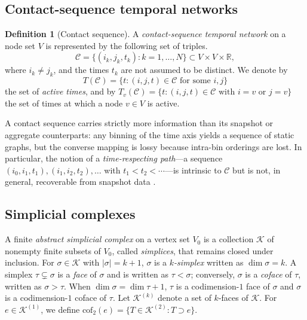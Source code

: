 \documentclass[
    pre,
    twocolumn,
    superscriptaddress,
    showpacs,
    nofootinbib,
    amsmath,
    amssymb,
    floatfix
]{revtex4-2}
\newcommand{\R}{\mathbb{R}}
\newcommand{\K}{\mathcal{K}}
\theoremstyle{plain} %
\theoremstyle{definition} %
\newtheorem{definition}{\indent Definition}
\begin{document}
\subsection{Contact-sequence temporal networks}\label{ssec:contact}

\begin{definition}[Contact sequence]
A \emph{contact-sequence temporal network} on a node set $V$ is represented by the following set of triples.
\begin{equation}
    \mathcal{C} = \bigl\{(i_k,j_k,t_k) : k = 1,\dots,N\bigr\}
    \subset V \times V \times \R,
\end{equation}
where $i_k \neq j_k$, and the times $t_k$ are not assumed to be distinct. We denote by
\begin{equation}
    T(\mathcal{C}) = \{t : (i,j,t)\in\mathcal{C}\text{ for some }i,j\}
\end{equation}
the set of \emph{active times}, and by $T_v(\mathcal{C}) = \{t : (i,j,t)\in\mathcal{C}\text{ with }i=v\text{ or }j=v\}$ the set of times at which a node $v\in V$ is active.
\end{definition}

A contact sequence carries strictly more information than its snapshot or aggregate counterparts: any binning of the time axis yields a sequence of static graphs, but the converse mapping is lossy because intra-bin orderings are lost.  In particular, the notion of a \emph{time-respecting path}---a sequence
$(i_0,i_1,t_1),(i_1,i_2,t_2),\dots$ with $t_1<t_2<\cdots$---is intrinsic to $\mathcal{C}$ but is not, in general, recoverable from snapshot data \cite{Holme2015}.

\subsection{Simplicial complexes}\label{ssec:simpcx}

A finite \emph{abstract simplicial complex} on a vertex set $V_0$ is a collection $\K$ of nonempty finite subsets of $V_0$, called \emph{simplices}, that remains closed under inclusion.
For $\sigma\in\K$ with $|\sigma|=k+1$, $\sigma$ is a
\emph{$k$-simplex} written as $\dim\sigma = k$.  A simplex
$\tau\subsetneq\sigma$ is a \emph{face} of $\sigma$ and is written as
$\tau<\sigma$; conversely, $\sigma$ is a \emph{coface} of $\tau$, written as $\sigma>\tau$. 
When $\dim\sigma=\dim\tau+1$, $\tau$ is a codimension-$1$ face of $\sigma$ and $\sigma$ is a codimension-$1$ coface of $\tau$. 
Let $\K^{(k)}$ denote a set of $k$-faces of $\K$.
For $e \in \K^{(1)}$, we define $\mathrm{cof}_2(e)=\{T\in\K^{(2)}:T\supset e\}$.
\end{document}
